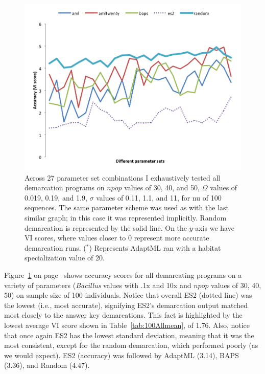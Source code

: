 \begin{figure}[h!]
  \centering
    \includegraphics[scale=0.75]{images/ResultGraphs/ResultGraphs-2}
      \caption[All demarcation graphical accuracy visualization on $nu = 100$.]{Across 27 parameter set combinations I exhaustively tested all demarcation programs on $npop$ values of 30, 40, and 50, $\Omega$ values of 0.019, 0.19, and 1.9, $\sigma$ values of 0.11, 1.1, and 11, for nu of 100 sequences. The same parameter scheme was used as with the last similar graph; in this case it was represented implicitly. Random demarcation is represented by the solid line. On the $y$-axis we have VI scores, where values closer to 0 represent more accurate demarcation runs.  ($^\ast$) Represents AdaptML ran with a habitat specialization value of 20.}
    \label{fig:All100}
\end{figure}

Figure~\ref{fig:All100} on page~\pageref{fig:All100} shows accuracy scores for all demarcating programs on a variety of parameters (\emph{Bacillus} values with .1x and 10x and $npop$ values of 30, 40, 50) on sample size of 100 individuals.
Notice that overall ES2 (dotted line) was the lowest (i.e., most accurate), signifying ES2's demarcation output matched most closely to the answer key demarcations.
This fact is highlighted by the lowest average VI score shown in Table~\ref{tab:100Allmean}, of 1.76.
Also, notice that once again ES2 has the lowest standard deviation, meaning that it was the most consistent, except for the random demarcation, which performed poorly (as we would expect).
ES2 (accuracy) was followed by AdaptML (3.14), BAPS (3.36), and Random (4.47).

